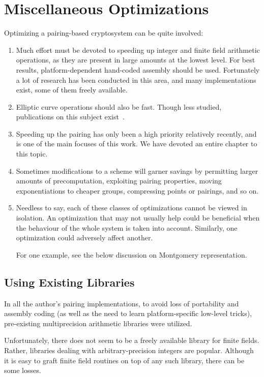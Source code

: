 \chapter{Miscellaneous Optimizations}

Optimizing a pairing-based cryptosystem can be quite involved:

\begin{enumerate}
\item
Much effort must be devoted to speeding up
integer and finite field arithmetic operations, as they are present
in large amounts at the lowest level. For best results, platform-dependent
hand-coded assembly should be used.
Fortunately a lot of research has been conducted in this area,
and many implementations exist, some of them freely available.
\item
Elliptic curve operations should also be fast. Though less studied,
publications on this subject exist~\cite{bss}.
\item
Speeding up the pairing has only been a high priority relatively recently,
and is one of the main focuses of this work. We have devoted an entire
chapter to this topic.
\item
Sometimes modifications to a scheme will garner savings by
permitting larger amounts of precomputation, exploiting pairing
properties, moving exponentiations to cheaper groups, compressing points or
pairings, and so on.
\item
Needless to say, each of these classes of optimizations cannot be viewed
in isolation. An optimization that may not usually help could be beneficial
when the behaviour of the whole system is taken into account.
Similarly, one optimization could adversely affect another.

For one example, see the below
discussion on Montgomery representation.
\end{enumerate}

\section{Using Existing Libraries}

In all the author's pairing implementations, to avoid loss of portability
and assembly coding (as well as the need to learn platform-specific
low-level tricks), pre-existing multiprecision arithmetic libraries
were utilized.

Unfortunately, there does not seem to be a freely available library for
finite fields. Rather, libraries dealing with arbitrary-precision integers
are popular. Although it is easy to graft finite field routines on top
of any such library, there can be some losses.

